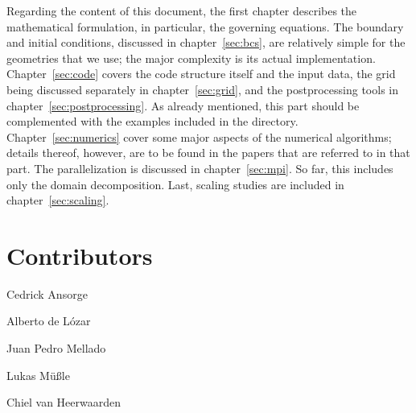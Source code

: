 Regarding the content of this document, the first chapter describes the mathematical formulation, in particular, the governing equations. The boundary and initial conditions, discussed in chapter~\ref{sec:bcs}, are relatively simple for the geometries that we use; the major complexity is its actual implementation. Chapter~\ref{sec:code} covers the code structure itself and the input data, the grid being discussed separately in chapter~\ref{sec:grid}, and the postprocessing tools in chapter~\ref{sec:postprocessing}. As already mentioned, this part should be complemented with the examples included in the directory. Chapter~\ref{sec:numerics} cover some major aspects of the numerical algorithms; details thereof, however, are to be found in the papers that are referred to in that part. The parallelization is discussed in chapter~\ref{sec:mpi}. So far, this includes only the domain decomposition. Last, scaling studies are included in chapter~\ref{sec:scaling}.

\chapter*{Contributors}
\sloppy

Cedrick Ansorge

Alberto de L{\'o}zar

Juan Pedro Mellado

Lukas M{\"u}{\ss}le

Chiel van Heerwaarden
